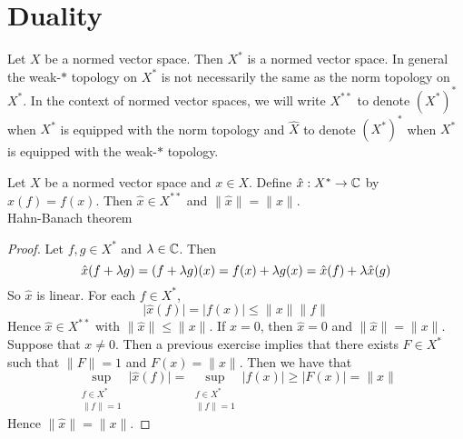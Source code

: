 \documentclass{book}
\begin{document}
	



























	\newpage
	\section{Duality}

	\begin{note}
		Let $X$ be a normed vector space. Then $X^*$ is a normed vector space. In general the weak-$*$ topology on $X^*$ is not necessarily the same as the norm topology on $X^*$. In the context of normed vector spaces, we will write $X^{**}$ to denote $(X^*)^*$ when $X^*$ is equipped with the norm topology and $\hat{X}$ to denote $(X^*)^*$ when $X^*$ is equipped with the weak-$*$ topology. 
	\end{note}
	
	\begin{ex} \lex{}
		Let $X$ be a normed vector space and $x \in X$. Define $\hat{x}:X^* \rightarrow \mathbb{C}$ by $\hat{x}(f) = f(x)$. Then $\hat{x} \in X^{**}$ and $\|\hat{x} \|= \|x \|$. \\
		 Hahn-Banach theorem
	\end{ex}
	
	\begin{proof}
		Let $f,g \in X^*$ and $\lambda \in \mathbb{C}$. Then $$\hat{x}(f+\lambda g) = (f+ \lambda g)(x) = f(x) + \lambda g(x) = \hat{x}(f) + \lambda \hat{x}(g)$$
		So $\hat{x}$ is linear. For each $f \in X^*$, $$\vert \hat{x}(f) \vert = \vert f(x) \vert \leq \|x \|\|f \|$$ Hence $\hat{x} \in X^{**}$ with $\|\hat{x} \|\leq \|x \|$. If $x=0$, then $\hat{x} = 0$ and $\|\hat{x} \|= \|x \|$. Suppose that $x \neq 0$. Then a previous exercise implies that there exists $F \in X^*$ such that $\|F \|=1$ and $F(x) = \|x \|$. Then we have that $$\sup_{\substack{f \in X^* \\ \|f \|= 1 } } \vert \hat{x}(f) \vert  = \sup_{\substack{f \in X^* \\ \|f \|= 1 }}  \vert f(x) \vert \geq \vert F(x) \vert = \|x \|$$
		Hence $\|\hat{x} \|= \|x \|$.
	\end{proof}
\end{document}
